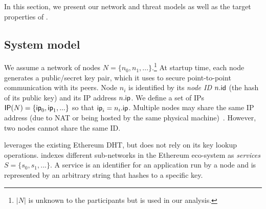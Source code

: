 In this section, we present our network and threat models as well as the target properties of \sysname. 

\subsection{System model}

We assume a network of nodes $N = \{n_0, n_1, ...\}$.\footnote{$|N|$ is unknown to the participants but is used in our analysis.}
At startup time, each node generates a public/secret key pair, which it uses to secure point-to-point communication with its peers.
Node $n_i$ is identified by its \emph{node ID} $n.\mathsf{id}$ (the hash of its public key) and its IP address $n.\mathsf{ip}$. 
We define a set of IPs $\mathsf{IP}(N) = \{\mathsf{ip}_0, \mathsf{ip}_1, ...\}$ so that $\mathsf{ip}_i = n_i.\mathsf{ip}$.
Multiple nodes may share the same IP address (due to NAT or being hosted by the same physical machine)~\cite{marcus2018low}.
However, two nodes cannot share the same ID.


\sysname leverages the existing Ethereum DHT, but does not rely on its key lookup operations.
\sysname indexes different sub-networks in the Ethereum eco-system as \emph{services} $S = \{s_0, s_1, ...\}$.
A service is an identifier for an application run by a node and is represented by an arbitrary string that hashes to a specific key. %


